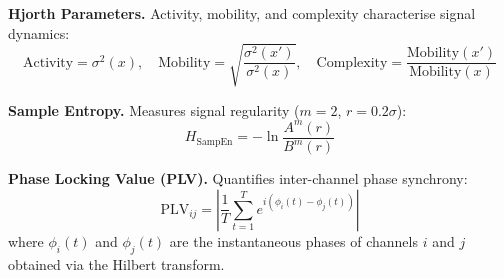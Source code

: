 
\textbf{Hjorth Parameters.} Activity, mobility, and complexity characterise signal dynamics:
\begin{equation}
\text{Activity} = \sigma^2(x), \quad
\text{Mobility} = \sqrt{\frac{\sigma^2(x')}{\sigma^2(x)}}, \quad
\text{Complexity} = \frac{\text{Mobility}(x')}{\text{Mobility}(x)}
\label{app_eq:hjorth_activity}
\end{equation}

\textbf{Sample Entropy.} Measures signal regularity ($m = 2$, $r = 0.2\sigma$):
\begin{equation}
H_{\text{SampEn}} = -\ln\frac{A^m(r)}{B^m(r)}
\label{app_eq:sample_entropy}
\end{equation}

\textbf{Phase Locking Value (PLV).} Quantifies inter-channel phase synchrony:
\begin{equation}
\text{PLV}_{ij} = \left| \frac{1}{T} \sum_{t=1}^{T} e^{i(\phi_i(t) - \phi_j(t))} \right|
\label{app_eq:plv}
\end{equation}
where $\phi_i(t)$ and $\phi_j(t)$ are the instantaneous phases of channels $i$ and $j$ obtained via the Hilbert transform.

